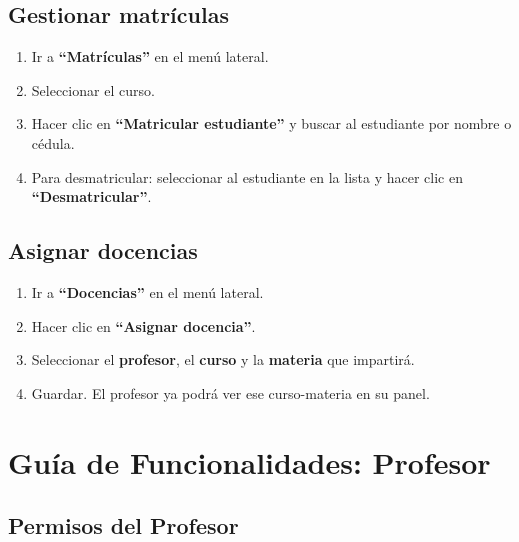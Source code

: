 \documentclass[12pt, a4paper]{article}
\begin{document}
\subsection{Gestionar matrículas}

\begin{enumerate}
    \item Ir a \textbf{``Matrículas''} en el menú lateral.
    \item Seleccionar el curso.
    \item Hacer clic en \textbf{``Matricular estudiante''} y buscar al estudiante por nombre o cédula.
    \item Para desmatricular: seleccionar al estudiante en la lista y hacer clic en \textbf{``Desmatricular''}.
\end{enumerate}

\subsection{Asignar docencias}

\begin{enumerate}
    \item Ir a \textbf{``Docencias''} en el menú lateral.
    \item Hacer clic en \textbf{``Asignar docencia''}.
    \item Seleccionar el \textbf{profesor}, el \textbf{curso} y la \textbf{materia} que impartirá.
    \item Guardar. El profesor ya podrá ver ese curso-materia en su panel.
\end{enumerate}

\section{Guía de Funcionalidades: Profesor}
\label{sec:profesor}

\subsection{Permisos del Profesor}
\end{document}
